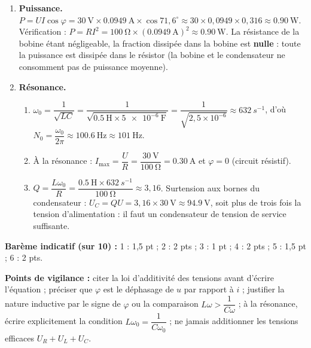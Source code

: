 \documentclass[11pt]{article}
\begin{document}
\begin{corrige}
\begin{enumerate}
\item \textbf{Puissance.} $P = UI\cos\varphi = \SI{30}{\volt} \times \SI{0,0949}{\ampere} \times \cos 71{,}6^{\circ} \approx 30 \times 0{,}0949 \times 0{,}316 \approx \SI{0,90}{\watt}$. Vérification : $P = RI^2 = \SI{100}{\ohm} \times (\SI{0,0949}{\ampere})^2 \approx \SI{0,90}{\watt}$. La résistance de la bobine étant négligeable, la fraction dissipée dans la bobine est \textbf{nulle} : toute la puissance est dissipée dans le résistor (la bobine et le condensateur ne consomment pas de puissance moyenne).
\item \textbf{Résonance.}
\begin{enumerate}
\item $\omega_0 = \dfrac{1}{\sqrt{LC}} = \dfrac{1}{\sqrt{\SI{0,5}{\henry} \times \SI{5e-6}{\farad}}} = \dfrac{1}{\sqrt{2,5\times10^{-6}}} \approx \SI{632}{s^{-1}}$, d'où $N_0 = \dfrac{\omega_0}{2\pi} \approx \SI{100,6}{\hertz} \approx \SI{101}{\hertz}$.
\item À la résonance : $I_{\max} = \dfrac{U}{R} = \dfrac{\SI{30}{\volt}}{\SI{100}{\ohm}} = \SI{0,30}{\ampere}$ et $\varphi = 0$ (circuit résistif).
\item $Q = \dfrac{L\omega_0}{R} = \dfrac{\SI{0,5}{\henry} \times \SI{632}{s^{-1}}}{\SI{100}{\ohm}} \approx 3{,}16$. Surtension aux bornes du condensateur : $U_C = QU = 3{,}16 \times \SI{30}{\volt} \approx \SI{94,9}{\volt}$, soit plus de trois fois la tension d'alimentation : il faut un condensateur de tension de service suffisante.
\end{enumerate}
\end{enumerate}
\textbf{Barème indicatif (sur 10) :} 1 : 1,5 pt ; 2 : 2 pts ; 3 : 1 pt ; 4 : 2 pts ; 5 : 1,5 pt ; 6 : 2 pts.

\textbf{Points de vigilance :} citer la loi d'additivité des tensions avant d'écrire l'équation ; préciser que $\varphi$ est le déphasage de $u$ par rapport à $i$ ; justifier la nature inductive par le signe de $\varphi$ ou la comparaison $L\omega > \dfrac{1}{C\omega}$ ; à la résonance, écrire explicitement la condition $L\omega_0 = \dfrac{1}{C\omega_0}$ ; ne jamais additionner les tensions efficaces $U_R + U_L + U_C$.
\end{corrige}
\end{document}
